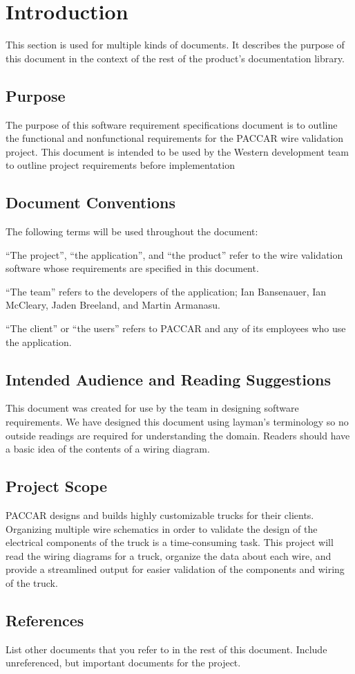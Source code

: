 \section{Introduction}
 This section is used for multiple kinds of documents.  It describes the
 purpose of this document in the context of the rest of the product's
 documentation library.  


\subsection{Purpose}
The purpose of this software requirement specifications document is to outline the functional and nonfunctional requirements for the PACCAR wire validation project. This document is intended to be used by the Western development team to outline project requirements before implementation

\subsection{Document Conventions}
 The following terms will be used throughout the document:

“The project”, “the application”, and “the product” refer to the wire validation software whose requirements are specified in this document.

“The team” refers to the developers of the application; Ian Bansenauer, Ian McCleary, Jaden Breeland, and Martin Armanasu.

“The client” or “the users” refers to PACCAR and any of its employees who use the application.

\subsection{Intended Audience and Reading Suggestions}
 This document was created for use by the team in designing software requirements. We have designed this document using layman's terminology so no outside readings are required for understanding the domain. Readers should have a basic idea of the contents of a wiring diagram.

\subsection{Project Scope}
PACCAR designs and builds highly customizable trucks for their clients. Organizing multiple wire schematics in order to validate the design of the electrical components of the truck is a time-consuming task. This project will read the wiring diagrams for a truck, organize the data about each wire, and provide a streamlined output for easier validation of the components and wiring of the truck.


\subsection{References}
 List other documents that you refer to in the rest of this document.  Include
 unreferenced, but important documents for the project.  


